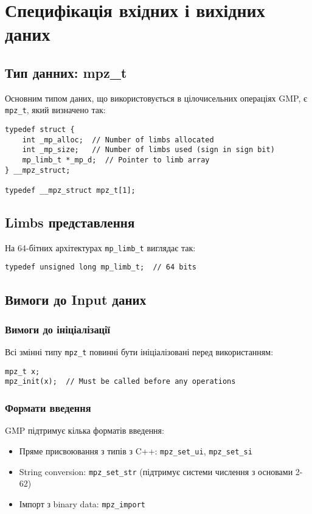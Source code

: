 \newpage
\section{Специфікація вхідних і вихідних даних}

\subsection{Тип данних: mpz\_t}
Основним типом даних, що використовується в цілочисельних операціях GMP, є \texttt{mpz\_t}, який визначено так:

\begin{verbatim}
typedef struct {
    int _mp_alloc;  // Number of limbs allocated
    int _mp_size;   // Number of limbs used (sign in sign bit)
    mp_limb_t *_mp_d;  // Pointer to limb array
} __mpz_struct;

typedef __mpz_struct mpz_t[1];
\end{verbatim}

\subsection{Limbs представлення}
На 64-бітних архітектурах \texttt{mp\_limb\_t} виглядає так:
\begin{verbatim}
typedef unsigned long mp_limb_t;  // 64 bits
\end{verbatim}

\subsection{Вимоги до Input даних}

\subsubsection{Вимоги до ініціалізації}
Всі змінні типу \texttt{mpz\_t} повинні бути ініціалізовані перед використанням:
\begin{verbatim}
mpz_t x;
mpz_init(x);  // Must be called before any operations
\end{verbatim}

\subsubsection{Формати введення}
GMP підтримує кілька форматів введення:
\begin{itemize}
    \item Пряме присвоювання з типів з C++: \texttt{mpz\_set\_ui}, \texttt{mpz\_set\_si}
    \item String conversion: \texttt{mpz\_set\_str} (підтримує системи числення з основами 2-62)
    \item Імпорт з binary data: \texttt{mpz\_import}
\end{itemize}


